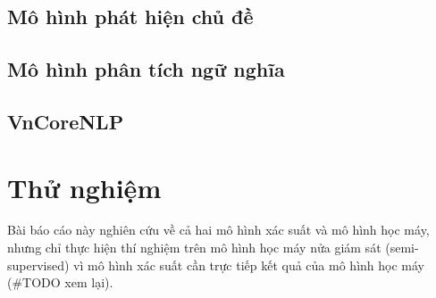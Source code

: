 \subsection{Mô hình phát hiện chủ đề}

\subsection{Mô hình phân tích ngữ nghĩa}

\subsection{VnCoreNLP}

\section{Thử nghiệm}
Bài báo cáo này nghiên cứu về cả hai mô hình xác suất và mô hình học máy, nhưng
chỉ thực hiện thí nghiệm trên mô hình học máy nửa giám sát (semi-supervised) vì
mô hình xác suất cần trực tiếp kết quả của mô hình học máy (\#TODO xem lại).

\label{sec:experiments}
